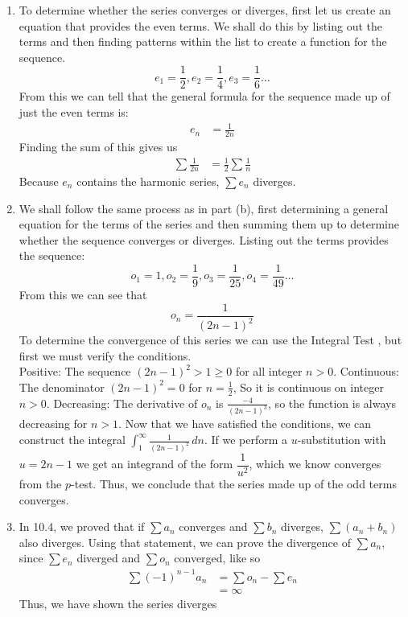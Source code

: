\documentclass{article}
\begin{document}
\begin{enumerate}[label=\textbf{(12.\arabic*)}]
\begin{enumerate}
\item To determine whether the series converges or diverges, first let us create an equation that provides the even terms. We shall do this by listing out the terms and then finding patterns within the list to create  a function for the sequence.
\[e_1=\frac{1}{2}, e_2=\frac{1}{4}, e_3=\frac{1}{6}\ldots\]
From this we can tell that the general formula for the sequence made up of just the even terms is:
\begin{align*}
e_n &= \frac{1}{2n}
\end{align*}
Finding the sum of this gives us
\begin{align*}
\sum \frac{1}{2n}
&= \frac{1}{2} \sum \frac{1}{n}
\end{align*} Because $e_n$ contains the harmonic series, $\sum e_n$ diverges.
\item We shall follow the same process as in part (b), first determining a general equation for the terms of the series and then summing them up to determine whether the sequence converges or diverges. Listing out the terms provides the sequence:
\[o_1=1,o_2=\frac{1}{9},o_3=\frac{1}{25},o_4=\frac{1}{49}\ldots\]
From this we can see that
\[o_n=\frac{1}{(2n-1)^2}\]
To determine the convergence of this series we can use the Integral Test , but first we must verify the conditions.\\
Positive: The sequence $(2n-1)^2>1\ge0$ for all integer $n>0$. Continuous: The denominator $(2n-1)^2=0$ for $n=\frac{1}{2}$, So it is continuous on integer $n>0$. Decreasing: The derivative of $o_n$ is $\frac{-4}{(2n-1)^3}$, so the function is always decreasing for $n>1$. Now that we have satisfied the conditions, we can construct the integral $\displaystyle \int_1^\infty \frac{1}{(2n-1)^2}\,dn$. If we perform a $u$-substitution with $u=2n-1$ we get an integrand of the form $\dfrac{1}{u^2}$, which we know converges from the $p$-test. Thus, we conclude that the series made up of the odd terms converges.
\item In 10.4, we proved that if $\sum a_n$ converges and $\sum b_n$ diverges, $\sum (a_n+b_n)$ also diverges. Using that statement, we can prove the divergence of $\sum a_n$, since $\sum e_n$ diverged and $\sum o_n$ converged, like so
\begin{align*}
\sum (-1)^{n-1} a_n &= \sum o_n - \sum e_n\\
&= \infty
\end{align*}
Thus, we have shown the series diverges
\end{enumerate}


\end{enumerate}
\end{document}

